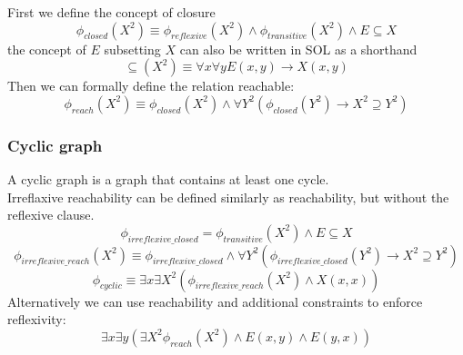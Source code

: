 \documentclass{article}
\begin{document}
First we define the concept of closure
\[\phi_{closed}(X^2) \equiv \phi_{reflexive}(X^2) \land \phi_{transitive}(X^2) \land E \subseteq X \]
the concept of $E$ subsetting $X$ can also be written in SOL as a shorthand
\[\subseteq(X^2) \equiv \forall x\forall y E(x, y) \rightarrow X(x, y)\]
Then we can formally define the relation reachable: 
\[\phi_{reach}(X^2) \equiv \phi_{closed}(X^2) \land \forall Y^2 (\phi_{closed}(Y^2) \rightarrow X^2\supseteq Y^2 )\]


\subsubsection{Cyclic graph}
A cyclic graph is a graph that contains at least one cycle. \\
Irreflaxive reachability can be defined similarly as reachability, but without the reflexive clause. 
\[\phi_{irreflexive\_closed} = \phi_{transitive}(X^2) \land E \subseteq X\]
\[\phi_{irreflexive\_reach}(X^2) \equiv \phi_{irreflexive\_closed} \land \forall Y^2(\phi_{irreflexive\_closed}(Y^2) \rightarrow X^2 \supseteq Y^2)\]
\[\phi_{cyclic} \equiv \exists x \exists X^2(\phi_{irreflexive\_reach}(X^2) \land X(x, x))\]
Alternatively we can use reachability and additional constraints to enforce reflexivity:
\[\exists x \exists y (\exists X^2 \phi_{reach}(X^2) \land E(x, y) \land E(y, x))\]
\end{document}
